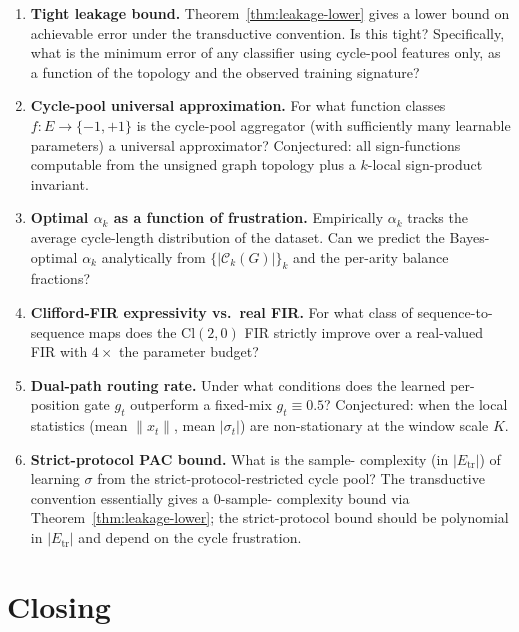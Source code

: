 \documentclass[11pt,a4paper]{article}
\theoremstyle{remark}
\newcommand{\Cl}[2]{\mathrm{Cl}(#1, #2)}
\begin{document}
\begin{enumerate}[label=(\alph*)]
\item \textbf{Tight leakage bound.} Theorem~\ref{thm:leakage-lower}
      gives a lower bound on achievable error under the
      transductive convention. Is this tight? Specifically, what
      is the minimum error of any classifier using cycle-pool
      features only, as a function of the topology and the
      observed training signature?
\item \textbf{Cycle-pool universal approximation.} For what
      function classes $f : E \to \{-1, +1\}$ is the cycle-pool
      aggregator (with sufficiently many learnable parameters) a
      universal approximator? Conjectured: all sign-functions
      computable from the unsigned graph topology plus a $k$-local
      sign-product invariant.
\item \textbf{Optimal $\alpha_k$ as a function of frustration.}
      Empirically $\alpha_k$ tracks the average cycle-length
      distribution of the dataset. Can we predict the
      Bayes-optimal $\alpha_k$ analytically from
      $\{|\mathcal{C}_k(G)|\}_k$ and the per-arity balance
      fractions?
\item \textbf{Clifford-FIR expressivity vs.\ real FIR.} For
      what class of sequence-to-sequence maps does the $\Cl{2}{0}$
      FIR strictly improve over a real-valued FIR with $4\times$
      the parameter budget?
\item \textbf{Dual-path routing rate.} Under what conditions does
      the learned per-position gate $g_t$ outperform a fixed-mix
      $g_t \equiv 0.5$? Conjectured: when the local statistics
      (mean $\|x_t\|$, mean $|\sigma_t|$) are non-stationary at the
      window scale $K$.
\item \textbf{Strict-protocol PAC bound.} What is the sample-
      complexity (in $|E_{\text{tr}}|$) of learning $\sigma$
      from the strict-protocol-restricted cycle pool? The
      transductive convention essentially gives a $0$-sample-
      complexity bound via Theorem~\ref{thm:leakage-lower}; the
      strict-protocol bound should be polynomial in $|E_{\text{tr}}|$
      and depend on the cycle frustration.
\end{enumerate}

\section*{Closing}
\end{document}
